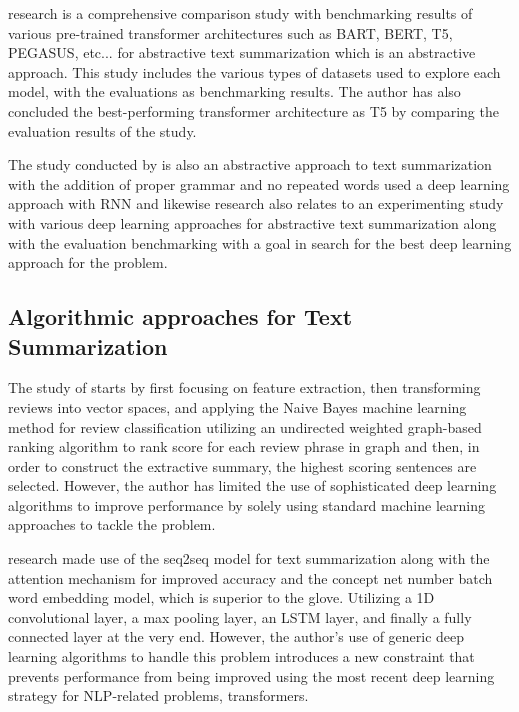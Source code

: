 \documentclass[conference]{IEEEtran}
\begin{document}
\cite{gupta_lehal_2010} research is a comprehensive comparison study with benchmarking results of various pre-trained transformer architectures such as BART, BERT, T5, PEGASUS, etc... for abstractive text summarization which is an abstractive approach. This study includes the various types of datasets used to explore each model, with the evaluations as benchmarking results. The author has also concluded the best-performing transformer architecture as T5 by comparing the evaluation results of the study. 

The study conducted by \cite{etemad_abidi_chhabra_2021} is also an abstractive approach to text summarization with the addition of proper grammar and no repeated words used a deep learning approach with RNN and likewise \cite{etemad_abidi_chhabra_2021} research also relates to an experimenting study with various deep learning approaches for abstractive text summarization along with the evaluation benchmarking with a  goal in search for the best deep learning approach for the problem.

\subsection{Algorithmic approaches for Text Summarization}
The study of \cite{khan_gul_zareei_biswal_zeb_naeem_saeed_salim_2020} starts by first focusing on feature extraction, then transforming reviews into vector spaces, and applying the Naive Bayes machine learning method for review classification utilizing an undirected weighted graph-based ranking algorithm to rank score for each review phrase in graph and then, in order to construct the extractive summary, the highest scoring sentences are selected. However, the author has limited the use of sophisticated deep learning algorithms to improve performance by solely using standard machine learning approaches to tackle the problem.

\cite{boorugu_ramesh_2020} research made use of the seq2seq model for text summarization along with the attention mechanism for improved accuracy and the concept net number batch word embedding model, which is superior to the glove. Utilizing a 1D convolutional layer, a max pooling layer, an LSTM layer, and finally a fully connected layer at the very end. However, the author's use of generic deep learning algorithms to handle this problem introduces a new constraint that prevents performance from being improved using the most recent deep learning strategy for NLP-related problems, transformers.
\end{document}
